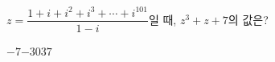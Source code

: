 $z=\dfrac{1+i+i^2+i^3+\cdots+i^{101}}{1-i}$일 때, $z^3+z+7$의 값은?
\begin{choices32}{$-7$}{$-3$}{$0$}{$3$}{$7$}\end{choices32}
